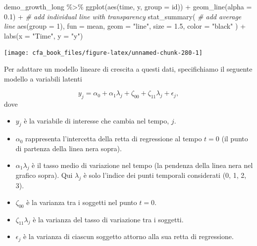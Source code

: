 \documentclass[
  11pt,
]{krantz}
\makeatletter
\newenvironment{Shaded}{\begin{snugshade}}{\end{snugshade}}
\newcommand{\AttributeTok}[1]{\textcolor[rgb]{0.61,0.61,0.61}{#1}}
\newcommand{\CommentTok}[1]{\textcolor[rgb]{0.37,0.37,0.37}{\textit{#1}}}
\newcommand{\DecValTok}[1]{\textcolor[rgb]{0.06,0.06,0.06}{#1}}
\newcommand{\FloatTok}[1]{\textcolor[rgb]{0.06,0.06,0.06}{#1}}
\newcommand{\FunctionTok}[1]{\textcolor[rgb]{0,0,0}{#1}}
\newcommand{\NormalTok}[1]{#1}
\newcommand{\SpecialCharTok}[1]{\textcolor[rgb]{0,0,0}{#1}}
\newcommand{\StringTok}[1]{\textcolor[rgb]{0.5,0.5,0.5}{#1}}
\providecommand{\tightlist}{%
  \setlength{\itemsep}{0pt}\setlength{\parskip}{0pt}}
\newenvironment{kframe}{%
\medskip{}
\setlength{\fboxsep}{.8em}
 \def\at@end@of@kframe{}%
 \ifinner\ifhmode%
  \def\at@end@of@kframe{\end{minipage}}%
  \begin{minipage}{\columnwidth}%
 \fi\fi%
 \def\FrameCommand##1{\hskip\@totalleftmargin \hskip-\fboxsep
 \colorbox{shadecolor}{##1}\hskip-\fboxsep
     \hskip-\linewidth \hskip-\@totalleftmargin \hskip\columnwidth}%
 \MakeFramed {\advance\hsize-\width
   \@totalleftmargin\z@ \linewidth\hsize
   \@setminipage}}%
 {\par\unskip\endMakeFramed%
 \at@end@of@kframe}
\renewenvironment{Shaded}{\begin{kframe}}{\end{kframe}}
\theoremstyle{definition}
\theoremstyle{definition}
\theoremstyle{definition}
\theoremstyle{definition}
\theoremstyle{remark}
\makeatother
\begin{document}
\begin{Shaded}
\begin{Highlighting}[]
\NormalTok{demo\_growth\_long }\SpecialCharTok{\%\textgreater{}\%}
  \FunctionTok{ggplot}\NormalTok{(}\FunctionTok{aes}\NormalTok{(time, y, }\AttributeTok{group =}\NormalTok{ id)) }\SpecialCharTok{+}
  \FunctionTok{geom\_line}\NormalTok{(}\AttributeTok{alpha =} \FloatTok{0.1}\NormalTok{) }\SpecialCharTok{+} \CommentTok{\# add individual line with transparency}
  \FunctionTok{stat\_summary}\NormalTok{( }\CommentTok{\# add average line}
    \FunctionTok{aes}\NormalTok{(}\AttributeTok{group =} \DecValTok{1}\NormalTok{),}
    \AttributeTok{fun =}\NormalTok{ mean,}
    \AttributeTok{geom =} \StringTok{"line"}\NormalTok{,}
    \AttributeTok{size =} \FloatTok{1.5}\NormalTok{,}
    \AttributeTok{color =} \StringTok{"black"}
\NormalTok{  ) }\SpecialCharTok{+}
  \FunctionTok{labs}\NormalTok{(}\AttributeTok{x =} \StringTok{"Time"}\NormalTok{, }\AttributeTok{y =} \StringTok{"y"}\NormalTok{)}
\end{Highlighting}
\end{Shaded}

\begin{center}\texttt{[image: cfa\_book\_files/figure-latex/unnamed-chunk-280-1]} \end{center}

Per adattare un modello lineare di crescita a questi dati, specifichiamo il seguente modello a variabili latenti

\[
y_j = \alpha_0 + \alpha_1 \lambda_j + \zeta_{00} + \zeta_{11} \lambda_j + \epsilon_j,
\] dove

\begin{itemize}
\tightlist
\item
  \(y_j\) è la variabile di interesse che cambia nel tempo, \(j\).
\item
  \(\alpha_0\) rappresenta l'intercetta della retta di regressione al tempo \(t = 0\) (il punto di partenza della linea nera sopra).
\item
  \(\alpha_1 \lambda_j\) è il tasso medio di variazione nel tempo (la pendenza della linea nera nel grafico sopra). Qui \(\lambda_j\) è solo l'indice dei punti temporali considerati (0, 1, 2, 3).
\item
  \(\zeta_{00}\) è la varianza tra i soggetti nel punto \(t = 0\).
\item
  \(\zeta_{11} \lambda_j\) è la varianza del tasso di variazione tra i soggetti.
\item
  \(\epsilon_j\) è la varianza di ciascun soggetto attorno alla sua retta di regressione.
\end{itemize}
\end{document}
